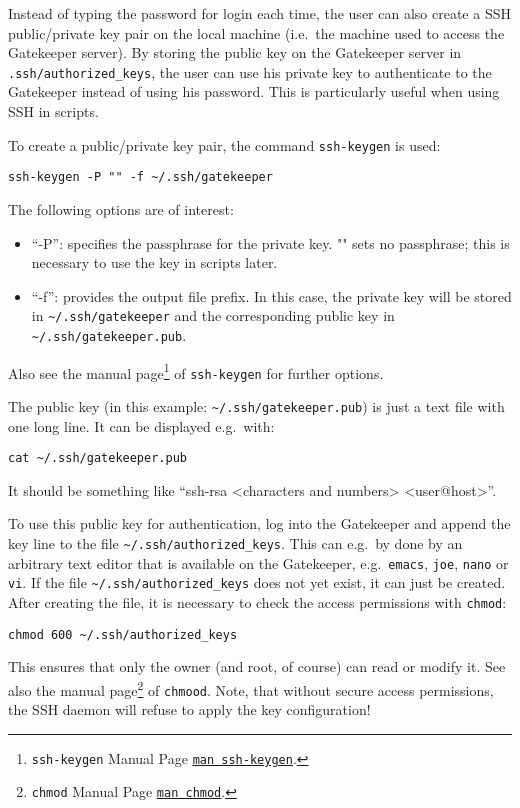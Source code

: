 Instead of typing the password for login each time, the user can also create a SSH public/private key pair on the local machine (i.e.\ the machine used to access the Gatekeeper server). By storing the public key on the Gatekeeper server in \texttt{.ssh/authorized\_keys}, the user can use his private key to authenticate to the Gatekeeper instead of using his password. This is particularly useful when using SSH in scripts.

To create a public/private key pair, the command \texttt{ssh-keygen} is used:
\begin{lstlisting}
ssh-keygen -P "" -f ~/.ssh/gatekeeper
\end{lstlisting}
The following options are of interest:
\begin{itemize}
 \item ``-P'': specifies the passphrase for the private key. "" sets no passphrase; this is necessary to use the key in scripts later.
 \item ``-f'': provides the output file prefix. In this case, the private key will be stored in \texttt{\textasciitilde/.ssh/gatekeeper} and the corresponding public key in \texttt{\textasciitilde/.ssh/gatekeeper.pub}.
\end{itemize}
Also see the manual page\footnote{\texttt{ssh-keygen} Manual Page \href{man:ssh-keygen}{\texttt{man ssh-keygen}}.} of \texttt{ssh-keygen} for further options.


The public key (in this example: \texttt{\textasciitilde/.ssh/gatekeeper.pub}) is just a text file with one long line. It can be displayed e.g.\ with:
\begin{lstlisting}
cat ~/.ssh/gatekeeper.pub
\end{lstlisting}
It should be something like ``ssh-rsa <characters and numbers> <user@host>''.

To use this public key for authentication, log into the Gatekeeper and append the key line to the file \texttt{\textasciitilde/.ssh/authorized\_keys}. This can e.g.\ by done by an arbitrary text editor that is available on the Gatekeeper, e.g.\
\texttt{emacs},
\texttt{joe},
\texttt{nano} or
\texttt{vi}. If the file \texttt{\textasciitilde/.ssh/authorized\_keys} does not yet exist, it can just be created. After creating the file, it is necessary to check the access permissions with \texttt{chmod}:
\begin{lstlisting}
chmod 600 ~/.ssh/authorized_keys
\end{lstlisting}
This ensures that only the owner (and root, of course) can read or modify it. See also the manual page\footnote{\texttt{chmod} Manual Page \href{man:chmod}{\texttt{man chmod}}.} of \texttt{chmood}. Note, that without secure access permissions, the SSH daemon will refuse to apply the key configuration!

